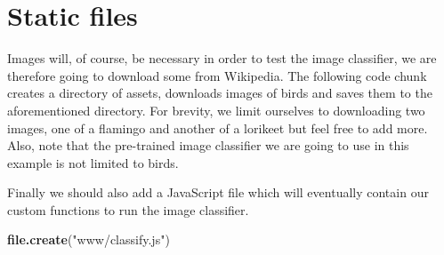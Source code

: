 \documentclass[10pt,]{krantz}
\makeatletter
\newenvironment{Shaded}{\begin{snugshade}}{\end{snugshade}}
\newcommand{\CommentTok}[1]{\textcolor[rgb]{0.37,0.37,0.37}{\textit{#1}}}
\newcommand{\DataTypeTok}[1]{\textcolor[rgb]{0.27,0.27,0.27}{#1}}
\newcommand{\KeywordTok}[1]{\textcolor[rgb]{0.27,0.27,0.27}{\textbf{#1}}}
\newcommand{\NormalTok}[1]{#1}
\newcommand{\StringTok}[1]{\textcolor[rgb]{0.5,0.5,0.5}{#1}}
\newenvironment{kframe}{%
\medskip{}
\setlength{\fboxsep}{.8em}
 \def\at@end@of@kframe{}%
 \ifinner\ifhmode%
  \def\at@end@of@kframe{\end{minipage}}%
  \begin{minipage}{\columnwidth}%
 \fi\fi%
 \def\FrameCommand##1{\hskip\@totalleftmargin \hskip-\fboxsep
 \colorbox{shadecolor}{##1}\hskip-\fboxsep
     \hskip-\linewidth \hskip-\@totalleftmargin \hskip\columnwidth}%
 \MakeFramed {\advance\hsize-\width
   \@totalleftmargin\z@ \linewidth\hsize
   \@setminipage}}%
 {\par\unskip\endMakeFramed%
 \at@end@of@kframe}
\renewenvironment{Shaded}{\begin{kframe}}{\end{kframe}}
\makeatother
\begin{document}
\hypertarget{shiny-complete-images}{%
\section{Static files}\label{shiny-complete-images}}

Images will, of course, be necessary in order to test the image classifier, we are therefore going to download some from Wikipedia. The following code chunk creates a directory of assets, downloads images of birds and saves them to the aforementioned directory. For brevity, we limit ourselves to downloading two images, one of a flamingo and another of a lorikeet but feel free to add more. Also, note that the pre-trained image classifier we are going to use in this example is not limited to birds.

\begin{Shaded}
\end{Shaded}

Finally we should also add a JavaScript file which will eventually contain our custom functions to run the image classifier.

\begin{Shaded}
\begin{Highlighting}[]
\KeywordTok{file.create}\NormalTok{(}\StringTok{"www/classify.js"}\NormalTok{)}
\end{Highlighting}
\end{Shaded}
\end{document}
